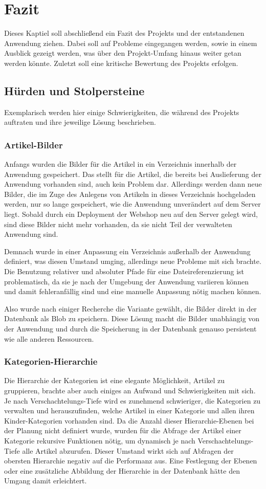 \section{Fazit} \thispagestyle{nomarkstyle}
Dieses Kaptiel soll abschließend ein Fazit des Projekts und der entstandenen Anwendung ziehen.
Dabei soll auf Probleme eingegangen werden, sowie in einem Ausblick gezeigt werden, was über den Projekt-Umfang hinaus weiter getan werden könnte. Zuletzt soll eine kritische Bewertung des Projekts erfolgen.
\subsection{Hürden und Stolpersteine}
Exemplarisch werden hier einige Schwierigkeiten, die während des Projekts auftraten und ihre jeweilige Lösung beschrieben.
\subsubsection{Artikel-Bilder}
Anfangs wurden die Bilder für die Artikel in ein Verzeichnis innerhalb der Anwendung gespeichert.
Das stellt für die Artikel, die bereits bei Auslieferung der Anwendung vorhanden sind, auch kein Problem dar.
Allerdings werden dann neue Bilder, die im Zuge des Anlegens von Artikeln in dieses Verzeichnis hochgeladen werden, nur so lange gespeichert, wie die Anwendung unverändert auf dem Server liegt.
Sobald durch ein Deployment der Webshop neu auf den Server gelegt wird, sind diese Bilder nicht mehr vorhanden, da sie nicht Teil der verwalteten Anwendung sind.

Demnach wurde in einer Anpassung ein Verzeichnis außerhalb der Anwendung definiert, was diesen Umstand umging, allerdings neue Probleme mit sich brachte.
Die Benutzung relativer und absoluter Pfade für eine Dateireferenzierung ist problematisch, da sie je nach der Umgebung der Anwendung variieren können und damit fehleranfällig sind und eine manuelle Anpassung nötig machen können.

Also wurde nach einiger Recherche die Variante gewählt, die Bilder direkt in der Datenbank als Blob zu speichern.
Diese Lösung macht die Bilder unabhängig von der Anwendung und durch die Speicherung in der Datenbank genauso persistent wie alle anderen Ressourcen.
\subsubsection{Kategorien-Hierarchie}
Die Hierarchie der Kategorien ist eine elegante Möglichkeit, Artikel zu gruppieren, brachte aber auch einiges an Aufwand und Schwierigkeiten mit sich.
Je nach Verschachtelungs-Tiefe wird es zunehmend schwieriger, die Kategorien zu verwalten und herauszufinden, welche Artikel in einer Kategorie und allen ihren Kinder-Kategorien vorhanden sind.
Da die Anzahl dieser Hierarchie-Ebenen bei der Planung nicht definiert wurde, wurden für die Abfrage der Artikel einer Kategorie rekursive Funktionen nötig, um dynamisch je nach Verschachtelungs-Tiefe alle Artikel abzurufen.
Dieser Umstand wirkt sich auf Abfragen der obersten Hierarchie negativ auf die Performanz aus.
Eine Festlegung der Ebenen oder eine zusätzliche Abbildung der Hierarchie in der Datenbank hätte den Umgang damit erleichtert.
